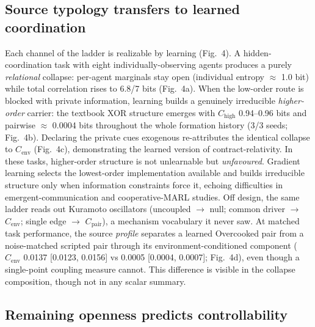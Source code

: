 \documentclass[11pt]{article}
\begin{document}
\subsection*{Source typology transfers to learned coordination}

Each channel of the ladder is realizable by learning (Fig.~4). A
hidden-coordination task with eight individually-observing agents
produces a purely \emph{relational} collapse: per-agent marginals stay
open (individual entropy $\approx$ 1.0 bit) while total correlation
rises to 6.8/7 bits (Fig.~4a). When the low-order route is blocked with
private information, learning builds a genuinely irreducible
\emph{higher-order} carrier: the textbook XOR structure emerges with
$C_\mathrm{high}$ 0.94--0.96 bits and pairwise $\approx$ 0.0004 bits
throughout the whole formation history (3/3 seeds; Fig.~4b). Declaring
the private cues exogenous re-attributes the identical collapse to
$C_\mathrm{env}$ (Fig.~4c), demonstrating the learned version of
contract-relativity. In these tasks, higher-order structure is not
unlearnable but \emph{unfavoured}.
Gradient learning selects the lowest-order implementation available and
builds irreducible structure only when information constraints force
it\citep{tishby2000information}, echoing difficulties in
emergent-communication\citep{mordatch2018emergence,lazaridou2017multi,foerster2016learning}
and cooperative-MARL\citep{lowe2017multi,rashid2018qmix}
studies. Off design, the same ladder reads out Kuramoto
oscillators (uncoupled $\to$ null; common driver $\to$
$C_\mathrm{env}$; single edge $\to$ $C_\mathrm{pair}$), a mechanism
vocabulary it never saw. At matched task performance, the source
\emph{profile} separates a learned Overcooked
pair\citep{carroll2019utility} from a noise-matched scripted pair
through its environment-conditioned component ($C_\mathrm{env}$
0.0137 [0.0123, 0.0156] vs 0.0005 [0.0004, 0.0007]; Fig.~4d), even
though a single-point coupling measure cannot. This difference is
visible in the collapse composition, though not in any scalar summary.

\subsection*{Remaining openness predicts controllability}
\end{document}
